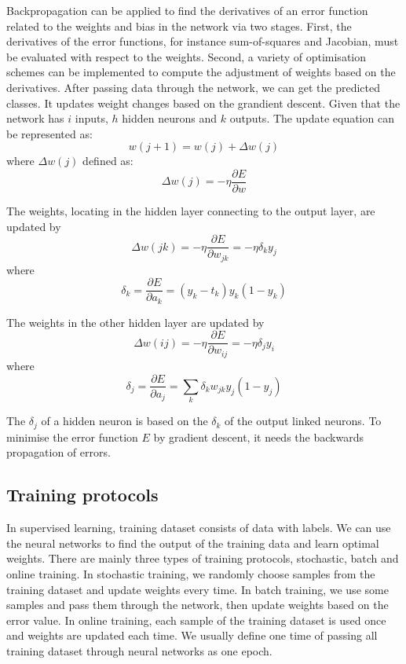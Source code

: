 Backpropagation can be applied to find the derivatives of an error function related to the weights and bias in the network via two stages. First, the derivatives of the error functions, for instance sum-of-squares and Jacobian, must be evaluated with respect to the weights. Second, a variety of optimisation schemes can be implemented to compute the adjustment of weights based on the derivatives. After passing data through the network, we can get the predicted classes. It updates weight changes based on the grandient descent. Given that the network has $i$ inputs, $h$ hidden neurons and $k$ outputs. The update equation can be represented as:
\begin{equation}\label{eq:UpdateWeights}
w(j+1) = w(j) + \Delta w(j)
\end{equation}
where $\Delta w(j)$ defined as:
\begin{equation}\label{eq:DeltaWeights}
\Delta w(j) = -\eta \frac{\partial E}{\partial w}
\end{equation}

The weights, locating in the hidden layer connecting to the output layer, are updated by
\begin{equation}\label{eq:h2oBP}
\Delta w(jk) = -\eta \frac{\partial E}{\partial w_{jk}} = -\eta \delta_{k}y_{j}
\end{equation}
where $$\delta_{k} = \frac{\partial E}{\partial a_{k}} = (y_{k} - t_{k})y_{k}(1 - y_{k})$$

The weights in the other hidden layer are updated by
\begin{equation}\label{eq:hiddenBP}
\Delta w(ij) = -\eta \frac{\partial E}{\partial w_{ij}} = -\eta \delta_{j}y_{i}
\end{equation}
where $$\delta_{j} = \frac{\partial E}{\partial a_{j}} = \displaystyle\sum_{k} \delta_{k}w_{jk}y_{j}(1 - y_{j})$$

The $\delta_{j}$ of a hidden neuron is based on the $\delta_{k}$ of the output linked neurons. To minimise the error function $E$ by gradient descent, it needs the backwards propagation of errors.

\subsection{Training protocols}

In supervised learning, training dataset consists of data with labels. We can use the neural networks to find the output of the training data and learn optimal weights. There are mainly three types of training protocols, stochastic, batch and online training. In stochastic training, we randomly choose samples from the training dataset and update weights every time. In batch training, we use some samples and pass them through the network, then update weights based on the error value. In online training, each sample of the training dataset is used once and weights are updated each time. We usually define one time of passing all training dataset through neural networks as one epoch.

